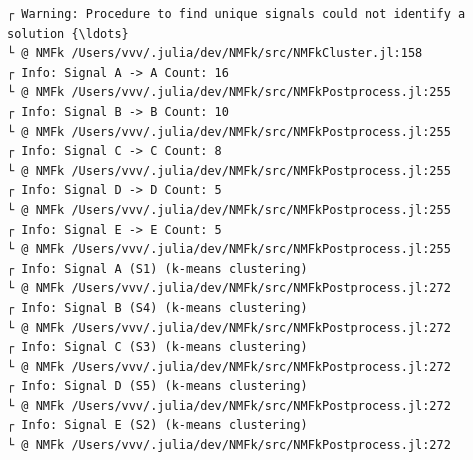 \documentclass[11pt]{article}
\begin{document}
    \begin{Verbatim}[commandchars=\\\{\}]
┌ Warning: Procedure to find unique signals could not identify a solution {\ldots}
└ @ NMFk /Users/vvv/.julia/dev/NMFk/src/NMFkCluster.jl:158
┌ Info: Signal A -> A Count: 16
└ @ NMFk /Users/vvv/.julia/dev/NMFk/src/NMFkPostprocess.jl:255
┌ Info: Signal B -> B Count: 10
└ @ NMFk /Users/vvv/.julia/dev/NMFk/src/NMFkPostprocess.jl:255
┌ Info: Signal C -> C Count: 8
└ @ NMFk /Users/vvv/.julia/dev/NMFk/src/NMFkPostprocess.jl:255
┌ Info: Signal D -> D Count: 5
└ @ NMFk /Users/vvv/.julia/dev/NMFk/src/NMFkPostprocess.jl:255
┌ Info: Signal E -> E Count: 5
└ @ NMFk /Users/vvv/.julia/dev/NMFk/src/NMFkPostprocess.jl:255
┌ Info: Signal A (S1) (k-means clustering)
└ @ NMFk /Users/vvv/.julia/dev/NMFk/src/NMFkPostprocess.jl:272
┌ Info: Signal B (S4) (k-means clustering)
└ @ NMFk /Users/vvv/.julia/dev/NMFk/src/NMFkPostprocess.jl:272
┌ Info: Signal C (S3) (k-means clustering)
└ @ NMFk /Users/vvv/.julia/dev/NMFk/src/NMFkPostprocess.jl:272
┌ Info: Signal D (S5) (k-means clustering)
└ @ NMFk /Users/vvv/.julia/dev/NMFk/src/NMFkPostprocess.jl:272
┌ Info: Signal E (S2) (k-means clustering)
└ @ NMFk /Users/vvv/.julia/dev/NMFk/src/NMFkPostprocess.jl:272
    \end{Verbatim}

    \begin{center}
    \end{center}
    { \hspace*{\fill} \\}
    
    \begin{Verbatim}[commandchars=\\\{\}]

    \end{Verbatim}

    \begin{center}
    \end{center}
    { \hspace*{\fill} \\}
    
    \begin{center}
    \end{center}
    { \hspace*{\fill} \\}
    
\end{document}
